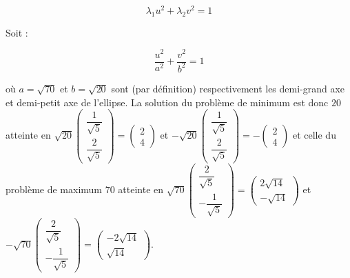 \documentclass{fancybook}
\begin{document}
\[ \lambda_1 u^2 + \lambda_2 v^2 = 1 \]

Soit :

\[ \dfrac{u^2}{a^2} + \dfrac{v^2}{b^2} = 1 \] 

où $a = \sqrt{70}$ et $b = \sqrt{20}$ sont (par définition) respectivement les demi-grand axe et demi-petit axe de l'ellipse. La solution du problème de minimum est donc $20$ atteinte en $\sqrt{20} \begin{pmatrix} \dfrac{1}{\sqrt{5}} \\ \dfrac{2}{\sqrt{5}} \end{pmatrix} = \begin{pmatrix} 2 \\ 4 \end{pmatrix}$ et $-\sqrt{20}\begin{pmatrix} \dfrac{1}{\sqrt{5}} \\ \dfrac{2}{\sqrt{5}}  \end{pmatrix} = -\begin{pmatrix} 2 \\ 4 \end{pmatrix} $ et celle du problème de maximum $70$ atteinte en $\sqrt{70}\begin{pmatrix} \dfrac{2}{\sqrt{5}} \\ -\dfrac{1}{\sqrt{5}} \end{pmatrix} = \begin{pmatrix} 2\sqrt{14} \\ -\sqrt{14} \end{pmatrix}$ et $-\sqrt{70} \begin{pmatrix} \dfrac{2}{\sqrt{5}} \\ -\dfrac{1}{\sqrt{5}} \end{pmatrix} = \begin{pmatrix} -2\sqrt{14} \\ \sqrt{14} \end{pmatrix}$.
\end{document}
